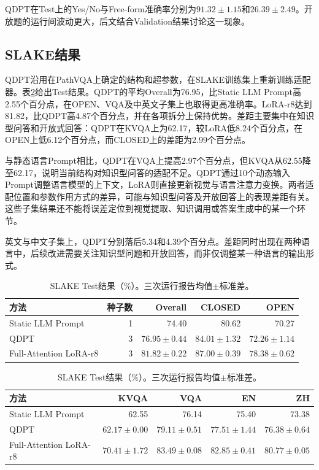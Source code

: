 \documentclass[pdflatex,sn-mathphys-num]{sn-jnl}
\begin{document}
QDPT在Test上的Yes/No与Free-form准确率分别为$91.32\pm1.15$和$26.39\pm2.49$。开放题的运行间波动更大，后文结合Validation结果讨论这一现象。

\subsection{SLAKE结果}

QDPT沿用在PathVQA上确定的结构和超参数，在SLAKE训练集上重新训练适配器。表\ref{tab:slake-results}给出Test结果。QDPT的平均Overall为76.95，比Static LLM Prompt高2.55个百分点，在OPEN、VQA及中英文子集上也取得更高准确率。LoRA-r8达到81.82，比QDPT高4.87个百分点，并在各项拆分上保持优势。差距主要集中在知识型问答和开放式回答：QDPT在KVQA上为62.17，较LoRA低8.24个百分点，在OPEN上低6.12个百分点，而CLOSED上的差距为2.99个百分点。

与静态语言Prompt相比，QDPT在VQA上提高2.97个百分点，但KVQA从62.55降至62.17，说明当前结构对知识型问答的适配不足。QDPT通过10个动态输入Prompt调整语言模型的上下文，LoRA则直接更新视觉与语言注意力变换。两者适配位置和参数作用方式的差异，可能与知识型问答及开放回答上的表现差距有关。这些子集结果还不能将误差定位到视觉提取、知识调用或答案生成中的某一个环节。

英文与中文子集上，QDPT分别落后5.34和4.39个百分点。差距同时出现在两种语言中，后续改进需要关注知识型问题和开放回答，而非仅调整某一种语言的输出形式。

\begin{table}[t]
    \centering
    \caption{SLAKE Test结果（\%）。三次运行报告均值$\pm$标准差。}
    \label{tab:slake-results}
    \scriptsize
    \begin{tabular}{@{}lrrrr@{}}
        \toprule
        方法 & 种子数 & Overall & CLOSED & OPEN \\
        \midrule
        Static LLM Prompt & 1 & 74.40 & 80.62 & 70.27 \\
        QDPT & 3 & $76.95\pm0.44$ & $84.01\pm1.32$ & $72.26\pm1.14$ \\
        Full-Attention LoRA-r8 & 3 & $81.82\pm0.22$ & $87.00\pm0.39$ & $78.38\pm0.62$ \\
        \bottomrule
    \end{tabular}
    \par\smallskip
    \begin{tabular}{@{}lrrrr@{}}
        \toprule
        方法 & KVQA & VQA & EN & ZH \\
        \midrule
        Static LLM Prompt & 62.55 & 76.14 & 75.40 & 73.38 \\
        QDPT & $62.17\pm0.00$ & $79.11\pm0.51$ & $77.51\pm1.44$ & $76.38\pm0.64$ \\
        Full-Attention LoRA-r8 & $70.41\pm1.72$ & $83.49\pm0.08$ & $82.85\pm0.41$ & $80.77\pm0.05$ \\
        \bottomrule
    \end{tabular}
\end{table}
\end{document}
